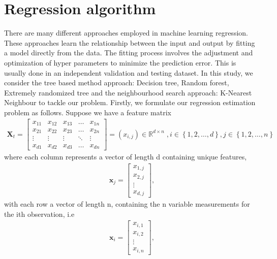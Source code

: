 \section{Regression algorithm} 
\label{algo1}
There are many different approaches employed in machine learning regression. These approaches learn the relationship between the input and output by fitting a model directly from the data. The fitting process involves the adjustment and optimization of hyper parameters to minimize the prediction error. This is usually done in an independent validation and testing dataset. In this study, we consider the tree based method approach: Decision tree, Random forest, Extremely randomized tree and the neighbourhood search approach: K-Nearest Neighbour to tackle our problem. Firstly, we formulate our regression estimation problem as follows. Suppose we have a feature matrix 
\begin{align*}
\textbf{X}_{t}=\begin{bmatrix}
    x_{11} & x_{12} & x_{13} & \dots  & x_{1n} \\
    x_{21} & x_{22} & x_{23} & \dots  & x_{2n} \\
    \vdots & \vdots & \vdots & \ddots & \vdots \\
    x_{d1} & x_{d2} & x_{d3} & \dots  & x_{dn}
\end{bmatrix}=(x_{i,j}) \in  \mathbb{R}^{d \times n}\;, i\in \left\{1,2,\dots, d\right\}, j \in \left\{1,2,\dots,n\right\}
\end{align*}
where each column represents a vector of length d containing unique features, 
\begin{align*}
\textbf{x}_j=\begin{bmatrix}
    x_{1,j}  \\
    x_{2,j} \\
    \vdots \\
    x_{d,j} 
\end{bmatrix},
\end{align*}
with each row a vector of length n, containing the n variable measurements for the ith observation, i.e 
\begin{align*}
\textbf{x}_i=\begin{bmatrix}
    x_{i,1}  \\
    x_{i,2} \\
    \vdots \\
    x_{i,n} 
\end{bmatrix},
\end{align*}


